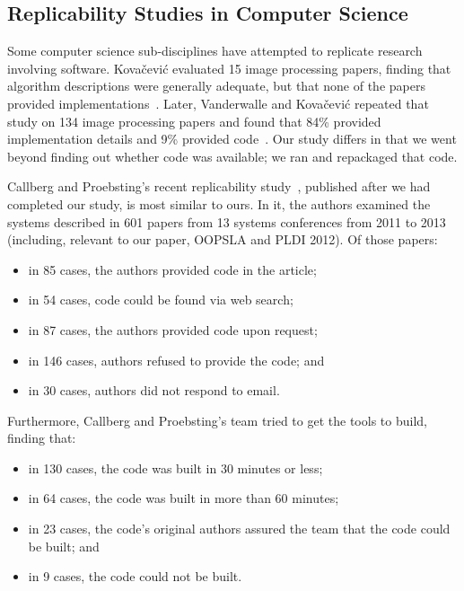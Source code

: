 \documentclass[10pt,conference]{IEEEtran}
\begin{document}
\subsection{Replicability Studies in Computer Science}

Some computer science sub-disciplines have attempted to replicate
research involving software.
Kova{\v{c}}evi{\'c} evaluated 15 image processing papers,
finding that algorithm descriptions were
generally adequate, but that none of the papers provided
implementations~\cite{kovacevic2007encourage}.
Later, Vanderwalle and Kova{\v{c}}evi{\'c} repeated that study on 134 
image processing papers and found that 84\% provided implementation details
and 9\% provided code~\cite{vandewalle2009reproducible}. 
Our study differs in that we went beyond finding out whether code was available;
we ran and repackaged that code.

Callberg and Proebsting's recent replicability study~\cite{collberg2016repeatability,proebsting2015repeatability},
published after we had completed our study, is most similar to ours. 
In it, the authors examined the systems described in 
601 papers from 13 systems conferences from 2011 to 2013
(including, relevant to our paper, OOPSLA and PLDI 2012).
Of those papers:

\begin{itemize}   
\item in 85 cases, the authors provided code in the article; 
\item in 54 cases, code could be found via web search;
\item in 87 cases, the authors provided code upon request;
\item in 146 cases, authors refused to provide the code; and
\item in 30 cases, authors did not respond to email.
\end{itemize}

\noindent
Furthermore, Callberg and Proebsting's team tried to get the tools to build, finding
that:

\begin{itemize} 
\item in 130 cases, the code was built in 30 minutes or less;
\item in 64 cases, the code was built in more than 60 minutes;
\item in 23 cases, the code's original authors assured the team that the code could be
			built; and
\item in 9 cases, the code could not be built.
\end{itemize}
\end{document}
